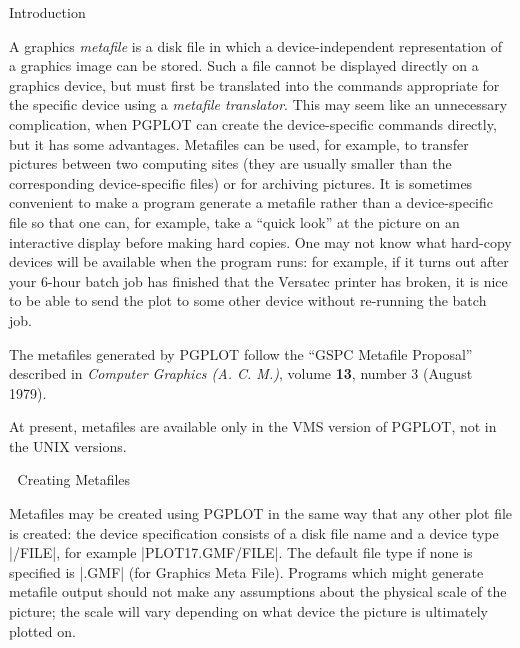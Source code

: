 

\beginsection Introduction

A graphics {\it metafile\/} is a disk file in which a device-independent
representation of a graphics image can be stored. Such a file cannot be
displayed directly on a graphics device, but must first be translated
into the commands appropriate for the specific device using a {\it
metafile translator}.  This may seem like an unnecessary complication,
when PGPLOT can create the device-specific commands directly, but it has
some advantages. Metafiles can be used, for example, to transfer
pictures between two computing sites (they are usually smaller than the
corresponding device-specific files) or for archiving pictures.  It is
sometimes convenient to make a program generate a metafile rather than a
device-specific file so that one can, for example, take a ``quick look''
at the picture on an interactive display before making hard copies. One
may not know what hard-copy devices will be available when the program
runs: for example, if it turns out after your 6-hour batch job has
finished that the Versatec printer has broken, it is nice to be able to
send the plot to some other device without re-running the batch job. 

The metafiles generated by PGPLOT follow the ``GSPC Metafile Proposal''
described in {\it Computer Graphics (A. C. M.)}, volume {\bf 13}, number
3 (August 1979). 

At present, metafiles are available only in the VMS version of PGPLOT, 
not in the UNIX versions.


\beginsection Creating Metafiles

Metafiles may be created using PGPLOT in the same way that any other
plot file is created: the device specification consists of a disk file
name and a device type |/FILE|, for example |PLOT17.GMF/FILE|. The
default file type if none is specified is |.GMF| (for Graphics Meta
File).  Programs which might generate metafile output should not make
any assumptions about the physical scale of the picture; the scale will
vary depending on what device the picture is ultimately plotted on. 

